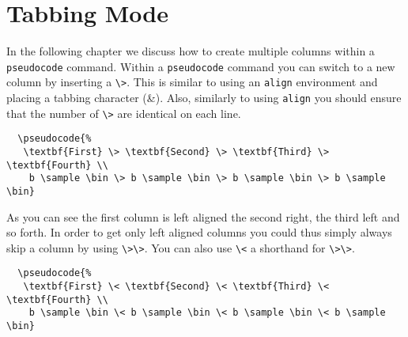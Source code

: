 \documentclass[a4paper]{report}
\begin{document}
  \chapter{Tabbing Mode}
  \label{chap:tabbing}
  \index{\&}
  In the following chapter we discuss how to create multiple columns within a \lstinline$pseudocode$ command.
  Within a \lstinline$pseudocode$ command you can switch to a new column by inserting a \lstinline$\>$. 
  This is similar to using an \lstinline$align$ environment and placing a tabbing character (\&). Also,
  similarly to using \lstinline$align$ you should ensure that the number of \lstinline$\>$ are identical
  on each line.
  \begin{center}
  \end{center}
  \begin{lstlisting}
  \pseudocode{%
   \textbf{First} \> \textbf{Second} \> \textbf{Third} \> \textbf{Fourth} \\
	b \sample \bin \> b \sample \bin \> b \sample \bin \> b \sample \bin}
  \end{lstlisting}
  As you can see the first column is left aligned the second right, the third left and so forth.
  In order to get only left aligned columns you could thus simply always skip a column by
  using \lstinline$\>\>$. You can also use \lstinline$\<$ a shorthand for \lstinline$\>\>$.
  \begin{center}
  \end{center}
  \begin{lstlisting}
  \pseudocode{%
   \textbf{First} \< \textbf{Second} \< \textbf{Third} \< \textbf{Fourth} \\
	b \sample \bin \< b \sample \bin \< b \sample \bin \< b \sample \bin}
  \end{lstlisting}
  
\end{document}
